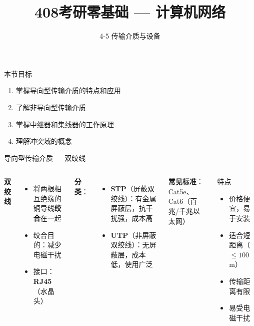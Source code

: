 \documentclass[10pt, aspectratio=169]{beamer}
\title{408考研零基础 --- 计算机网络}
\subtitle{4-5 传输介质与设备}
\author{}
\date{}
\begin{document}
\begin{frame}{本节目标}
    \begin{enumerate}
        \item 掌握导向型传输介质的特点和应用
        \item 了解非导向型传输介质
        \item 掌握中继器和集线器的工作原理
        \item 理解冲突域的概念
    \end{enumerate}
\end{frame}

\begin{frame}{导向型传输介质 --- 双绞线}
    \begin{columns}[T]
        \textbf{双绞线}
        \begin{itemize}
            \item 将两根相互绝缘的铜导线\textbf{绞合}在一起
            \item 绞合目的：减少电磁干扰
            \item 接口：\textbf{RJ45}（水晶头）
        \end{itemize}
        \vspace{0.3em}
        \textbf{分类}：
        \begin{itemize}
            \item \textbf{STP}（屏蔽双绞线）：有金属屏蔽层，抗干扰强，成本高
            \item \textbf{UTP}（非屏蔽双绞线）：无屏蔽层，成本低，使用广泛
        \end{itemize}
        \vspace{0.3em}
        \textbf{常见标准}：Cat5e、Cat6（百兆/千兆以太网）
        \begin{block}{特点}
            \begin{itemize}
                \item[\color{green!70!black}$\checkmark$] 价格便宜，易于安装
                \item[\color{green!70!black}$\checkmark$] 适合短距离（$\le 100$m）
                \item[\color{red!70!black}$\times$] 传输距离有限
                \item[\color{red!70!black}$\times$] 易受电磁干扰
            \end{itemize}
        \end{block}
    \end{columns}
\end{frame}
\end{document}
